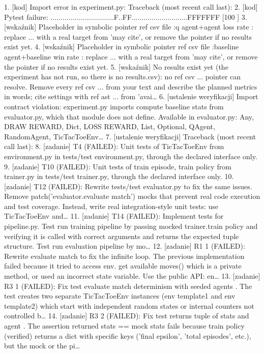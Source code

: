 \documentclass[conference]{IEEEtran}
\begin{document}
1. [kod] Import error in experiment.py: Traceback (most recent call last):
2. [kod] Pytest failure: ................................F..FF............................FFFFFFF [100 ]
3. [wskaźnik] Placeholder in symbolic pointer ref csv file :q agent+agent loss rate : replace ... with a real target from 'may cite', or remove the pointer if no results exist yet.
4. [wskaźnik] Placeholder in symbolic pointer ref csv file :baseline agent+baseline win rate : replace ... with a real target from 'may cite', or remove the pointer if no results exist yet.
5. [wskaźnik] No results exist yet (the experiment has not run, so there is no results.csv): no ref csv ... pointer can resolve. Remove every ref csv ... from your text and describe the planned metrics in words; cite settings with ref ast ... from 'avai…
6. [ustalenie weryfikacji] Import contract violation: experiment.py imports compute baseline stats from evaluator.py, which that module does not define. Available in evaluator.py: Any, DRAW REWARD, Dict, LOSS REWARD, List, Optional, QAgent, RandomAgent, TicTacToeEnv…
7. [ustalenie weryfikacji] Traceback (most recent call last):
8. [zadanie] T4 (FAILED): Unit tests of TicTacToeEnv from environment.py in tests/test environment.py, through the declared interface only.
9. [zadanie] T10 (FAILED): Unit tests of train episode, train policy from trainer.py in tests/test trainer.py, through the declared interface only.
10. [zadanie] T12 (FAILED): Rewrite tests/test evaluator.py to fix the same issues. Remove patch('evaluator.evaluate match') mocks that prevent real code execution and test coverage. Instead, write real integration-style unit tests: use TicTacToeEnv and…
11. [zadanie] T14 (FAILED): Implement tests for pipeline.py. Test run training pipeline by passing mocked trainer.train policy and verifying it is called with correct arguments and returns the expected tuple structure. Test run evaluation pipeline by mo…
12. [zadanie] R1 1 (FAILED): Rewrite evaluate match to fix the infinite loop. The previous implementation failed because it tried to access env. get available moves() which is a private method, or used an incorrect state variable. Use the public API: en…
13. [zadanie] R3 1 (FAILED): Fix test evaluate match determinism with seeded agents . The test creates two separate TicTacToeEnv instances (env template1 and env template2) which start with independent random states or internal counters not controlled b…
14. [zadanie] R3 2 (FAILED): Fix test returns tuple of stats and agent . The assertion returned stats == mock stats fails because train policy (verified) returns a dict with specific keys ('final epsilon', 'total episodes', etc.), but the mock or the pi…
\end{document}
